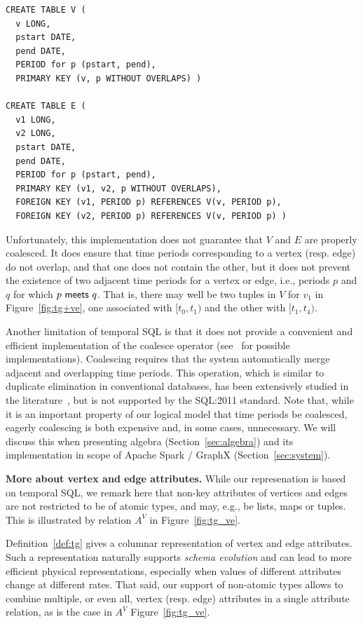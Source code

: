 \begin{small}
\begin{verbatim}
CREATE TABLE V (
  v LONG,
  pstart DATE,
  pend DATE,
  PERIOD for p (pstart, pend),
  PRIMARY KEY (v, p WITHOUT OVERLAPS) )

CREATE TABLE E (
  v1 LONG,
  v2 LONG,
  pstart DATE,
  pend DATE,
  PERIOD for p (pstart, pend),
  PRIMARY KEY (v1, v2, p WITHOUT OVERLAPS),
  FOREIGN KEY (v1, PERIOD p) REFERENCES V(v, PERIOD p),
  FOREIGN KEY (v2, PERIOD p) REFERENCES V(v, PERIOD p) )
\end{verbatim}
\end{small}

Unfortunately, this implementation does not guarantee that $V$ and $E$
are properly coalesced.  It does ensure that time periods
corresponding to a vertex (resp. edge) do not overlap, and that one
does not contain the other, but it does not prevent the existence of
two adjacent time periods for a vertex or edge, i.e., periods $p$ and
$q$ for which $p~\mathsf{meets}~q$.  That is, there may well be two
tuples in $V$ for $v_1$ in Figure~\ref{fig:tg+ve}, one associated with
$[t_0,t_1)$ and the other with $[t_1,t_4)$.

Another limitation of temporal SQL is that it does not provide a
convenient and efficient implementation of the coalesce operator
(see~\cite{DBLP:reference/db/Bohlen09} for possible implementations).
Coalescing requires that the system automatically merge adjacent and
overlapping time periods.  This operation, which is similar to
duplicate elimination in conventional databases, has been extensively
studied in the
literature~\cite{DBLP:conf/vldb/BohlenSS96,DBLP:journals/sigmod/Zimanyi06},
but is not supported by the SQL:2011 standard.  Note that, while it is
an important property of our logical model that time periods be
coalesced, eagerly coalescing is both expensive and, in some cases,
unnecessary.  We will discuss this when presenting \tg algebra
(Section~\ref{sec:algebra}) and its implementation in scope of Apache
Spark / GraphX (Section~\ref{sec:system}).

{\bf More about vertex and edge attributes.} While our \ve
represenation is based on temporal SQL, we remark here that non-key
attributes of vertices and edges are not restricted to be of atomic
types, and may, e.g., be lists, maps or tuples. This is illustrated by
relation $A^V$ in Figure~\ref{fig:tg_ve}.

Definition~\ref{def:tg} gives a columnar representation of vertex and
edge attributes.  Such a representation naturally supports {\em schema
  evolution} and can lead to more efficient physical representations,
especially when values of different attributes change at different
rates.  That said, our support of non-atomic types allows to combine
multiple, or even all, vertex (resp. edge) attributes in a single
attribute relation, as is the case in $A^V$ Figure~\ref{fig:tg_ve}.

